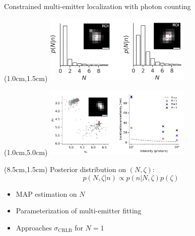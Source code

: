 \documentclass{beamer}					%
\begin{document}
\begin{frame}{Constrained multi-emitter localization with photon counting}

\begin{textblock*}{7cm}(1.0cm,1.5cm)
\includegraphics[width=7cm]{../../spad/spad/media/Figure-4.png}
\end{textblock*}

\begin{textblock*}{7cm}(1.0cm,5.0cm)
\includegraphics[width=7cm]{../../spad/spad/media/Figure-5.png}
\end{textblock*}


\begin{textblock*}{6cm}(8.5cm,1.5cm)
Posterior distribution on $(N,\zeta)$:
\begin{equation*}
p(N,\zeta\lvert n) \propto p(n\lvert N,\zeta)p(\zeta)
\end{equation*}
\begin{itemize}
\item MAP estimation on $N$
\item Parameterization of multi-emitter fitting
\item Approaches $\sigma_{\mathrm{CRLB}}$ for $N=1$
\end{itemize}
\end{textblock*}

\end{frame}
\end{document}

